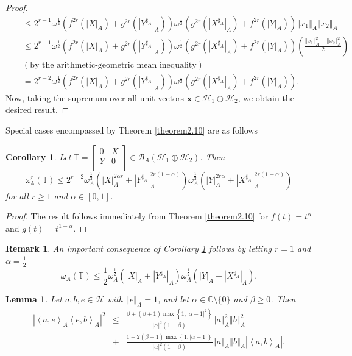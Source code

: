 \documentclass{article}
\newcommand{\bra}[1]{\left(#1\right)}
\newcommand{\seqA}[1]{{\left<#1\right>}_{A}}
\newcommand{\normA}[1]{{\left\Vert#1\right\Vert}_{A}}
\newcommand{\abs}[1]{\left\vert#1\right\vert}
\newcommand{\set}[1]{\left\{#1\right\}}
\renewcommand{\c}{\mathbb C}
\newcommand {\A}{\mathbb{A}}
\newcommand {\T}{\mathbb{T}}
\newcommand {\Y}{\mathbb{Y}}
\newcommand {\h}{\mathcal{H}}
\newcommand {\Xa}{X^{\sharp_{A}}}
\renewcommand {\b}{\mathcal{B}}
\newcommand {\Ya}{Y^{\sharp_{A}}}
\newtheorem{lemma}[theorem]{Lemma}
\newtheorem{corollary}[theorem]{Corollary}
\newtheorem{remark}[theorem]{Remark}
\begin{document}
\begin{proof}
\begin{eqnarray*}
  &&\leq 2^{r-1}\omega^{\frac{1}{2}}\bra{f^{2r}(|X|_A)+g^{2r}(|\Ya|_A)}\omega^{\frac{1}{2}}\bra{g^{2r}(|\Xa|_A)+f^{2r}(|Y|_A)}\normA{x_1}\normA{x_2}\\
  &&\leq
  2^{r-1}\omega^{\frac{1}{2}}\bra{f^{2r}(|X|_A)+g^{2r}(|\Ya|_A)}\omega^{\frac{1}{2}}\bra{g^{2r}(|\Xa|_A)
  +f^{2r}(|Y|_A)}\bra{\frac{\normA{x_1}^2+\normA{x_2}^2}{2}}\\
  &&\bra{\mbox{by the arithmetic-geometric mean inequality}}\\
  &&=2^{r-2}\omega^{\frac{1}{2}}\bra{f^{2r}(|X|_A)+g^{2r}(|\Ya|_A)}\omega^{\frac{1}{2}}\bra{g^{2r}(|\Xa|_A)+f^{2r}(|Y|_A)}.
\end{eqnarray*}
Now, taking the supremum over all unit vectors $\mathbf{x}\in\h_1\oplus\h_2$, we obtain the desired result.
\end{proof}
Special cases encompassed by Theorem \ref{theorem2.10} are as follows
\begin{corollary}\label{cor2.11} Let $\T=\begin{bmatrix} 0 &X \\Y& 0 \\\end{bmatrix}\in\b_A(\h_1\oplus\h_2)$. Then
 \begin{equation*}
   \omega_{\A}^r(\T)\leq 2^{r-2}\omega_A^{\frac{1}{2}}\bra{|X|_A^{2\alpha r}+|\Ya|_A^{2r(1-\alpha)}}
   \omega_A^{\frac{1}{2}}\bra{|Y|_A^{2r\alpha}+|\Xa|_A^{2r(1-\alpha)}}
 \end{equation*}
 for all $r\geq 1$ and $\alpha\in [0,1]$.
\end{corollary}
\begin{proof} The result follows immediately from Theorem \ref{theorem2.10} for $f(t)=t^{\alpha}$ and
$g(t)=t^{1-\alpha}$.
\end{proof}
\begin{remark} An important consequence of Corollary \ref{cor2.11} follows by letting $r=1$ and $\alpha=\frac{1}{2}$
\begin{equation*}
  \omega_A(\T)\leq \frac{1}{2}\omega_A^{\frac{1}{2}}\bra{|X|_A+|\Ya|_A}
   \omega_A^{\frac{1}{2}}\bra{|Y|_A+|\Xa|_A}.
\end{equation*}
\end{remark}
\begin{lemma}\label{Mix-al-be} Let $a,b,e\in\h$ with $\normA{e}=1$, and let $\alpha\in\c\setminus\{0\}$ and $\beta\geq 0$.
Then
\begin{eqnarray}\label{Mixed-Buz}
  \abs{\seqA{a,e}\seqA{e,b}}^2&\leq& \frac{\beta+(\beta+1)\max\set{1,\abs{\alpha-1}^2}}{\abs{\alpha}^2(1+\beta)}\normA{a}^2\normA{b}^2\nonumber \\
  &+&\frac{1+2(\beta+1)\max\set{1,\abs{\alpha-1}}}{\abs{\alpha}^2(1+\beta)}\normA{a}\normA{b}\abs{\seqA{a,b}}.
\end{eqnarray}
\end{lemma}
\end{document}

